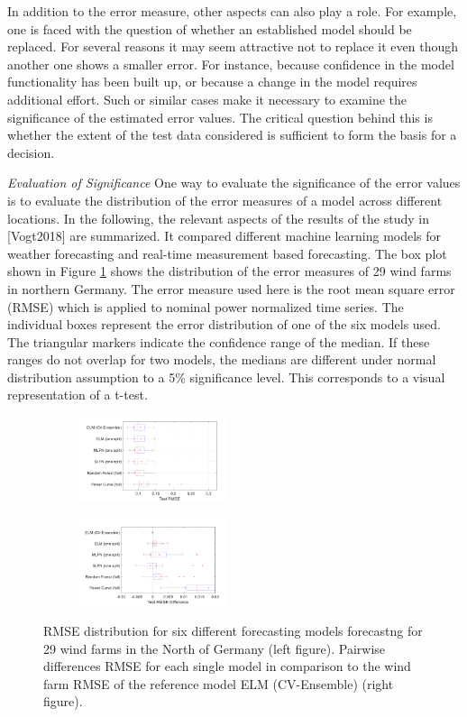 In addition to the error measure, other aspects can also play a role. For example, one is faced with the question of whether an established model should be replaced. For several reasons it may seem attractive not to replace it even though another one shows a smaller error. For instance, because confidence in the model functionality has been built up, or because a change in the model requires additional effort. Such or similar cases make it necessary to examine the significance of the estimated error values. The critical question behind this is whether the extent of the test data considered is sufficient to form the basis for a decision. 

\emph{Evaluation of Significance}
One way to evaluate the significance of the error values is to evaluate the distribution of the error measures of a model across different locations. In the following, the relevant aspects of the results of the study in [Vogt2018] are summarized. It compared different machine learning models for weather forecasting and real-time measurement based forecasting. The box plot shown in Figure \ref{fig:significance} shows the distribution of the error measures of 29 wind farms in northern Germany. The error measure used here is the root mean square error (RMSE) which is applied to nominal power normalized time series.
The individual boxes represent the error distribution of one of the six models used.  The triangular markers indicate the confidence range of the median. If these ranges do not overlap for two models, the medians are different under normal distribution assumption to a 5\% significance level. This corresponds to a visual representation of a t-test. 


\begin{figure}[h!]
 \begin{subfigure}
  \centering
  \includegraphics[width=0.48\textwidth]{figures/significance1.png}
 \end{subfigure}
\begin{subfigure}
 \centering
 \includegraphics[width=0.48\textwidth]{figures/significance2.png}
\end{subfigure}
\caption{RMSE distribution for six different forecasting models forecastng for 29 wind farms in the North of Germany (left figure). Pairwise differences RMSE for each single model in comparison to the wind farm RMSE of the reference model ELM (CV-Ensemble) \cite{vogt2018} (right figure). }
\label{fig:significance}
\end{figure}


